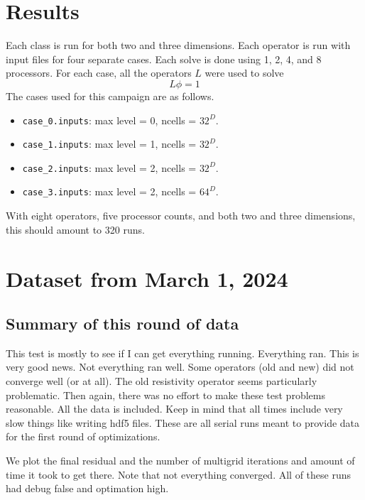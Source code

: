 \documentclass{article}
\begin{document}
 \section{Results}
 
 Each class is run for both two and three dimensions.   Each operator
 is run with input files for  four separate cases.    Each solve is
 done using 1, 2, 4, and 8 processors.
 For each case, all the operators $L$ were used to solve
$$
L\phi = 1
$$
The cases used for this campaign are as follows.
 \begin{itemize}
   \item {\tt case\_0.inputs}: max level = 0, ncells = $32^D$.
   \item {\tt case\_1.inputs}: max level = 1, ncells = $32^D$.
   \item {\tt case\_2.inputs}: max level = 2, ncells = $32^D$.
   \item {\tt case\_3.inputs}: max level = 2, ncells = $64^D$.
 \end{itemize}
 With eight operators, five processor counts,
 and both two and three dimensions,
 this should amount to 320 runs.    
\section{Dataset from March 1, 2024}
 
\subsection{Summary of this round of data}

This test is mostly to see if I can get everything running.
Everything ran.   This is very good news.   Not everything ran well.
Some operators (old and new) did not converge well (or at all).   The old
resistivity operator seems particularly problematic.   Then
again, there was no effort to make these test problems reasonable.
All the data is included.   Keep in mind that all times include very
slow things like writing hdf5 files.   These are all serial runs meant
to provide data for the first round of optimizations.   

We plot the final residual and the  number of multigrid iterations and
amount of time it took to get there. Note that not everything
converged. All of these runs had debug false and optimation high.
\end{document}
